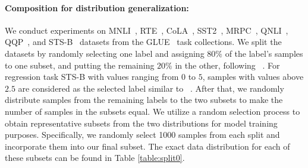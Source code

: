 \paragraph{Composition for distribution generalization:}
We conduct experiments on MNLI~\citep{williams2017broad}, RTE~\citep{giampiccolo2007third}, CoLA~\citep{warstadt2019cola}, SST2~\citep{socher2013recursive}, MRPC~\citep{dolan2005automatically}, QNLI~\citep{rajpurkar2016squad}, QQP~\citep{iyer2017first}, and STS-B~ \citep{cer2017semeval} datasets from the GLUE~\citep{wang2018glue} task collections.
We split the datasets by randomly selecting one label and assigning $80\%$ of the label's samples to one subset, and putting the remaining $20\%$ in the other, following ~\citet{jin2022dataless}. For regression task STS-B  with values ranging from $0$ to $5$, samples with values above $2.5$ are considered as the selected label similar to ~\citet{matena2022merging}. After that, we randomly distribute samples from the remaining labels to the two subsets to make the number of samples in the subsets equal. 
We utilize a random selection process to obtain representative subsets from the two distributions for model training purposes. Specifically, we randomly select 1000 samples from each split and incorporate them into our final subset. The exact data distribution for each of these subsets can be found in Table \ref{table:split0}.


